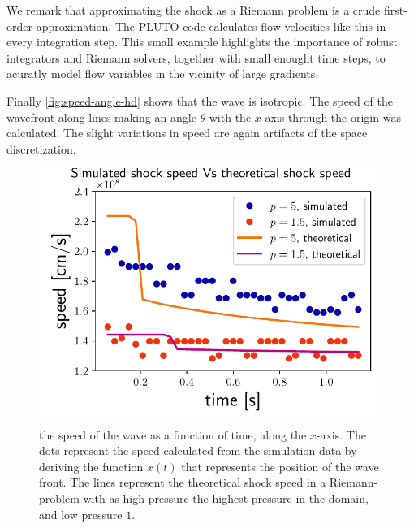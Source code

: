 We remark that approximating the shock as a Riemann problem is a crude first-order approximation. 
The PLUTO code calculates flow velocities like this in every integration step. 
This small example highlights the importance of robust integrators and Riemann solvers, together with small enought time steps, to acuratly model flow variables in the vicinity of large gradients.

Finally \autoref{fig:speed-angle-hd} shows that the wave is isotropic. 
The speed of the wavefront along lines making an angle $\theta$ with the $x$-axis through the origin was calculated.
The slight variations in speed are again artifacts of the space discretization.




\begin{figure}[H]
	\centering
	\includegraphics[width=\linewidth]{images/speed-time-hd.pdf}
	\caption{the speed of the wave as a function of time, along the $x$-axis. The dots represent the speed calculated from the simulation data by deriving the function $x(t)$ that represents the position of the wave front. The lines represent the theoretical shock speed in a Riemann-problem with as high pressure the highest pressure in the domain, and low pressure $1$.}
	\label{fig:speed-time-hd}
\end{figure}

\newpage
